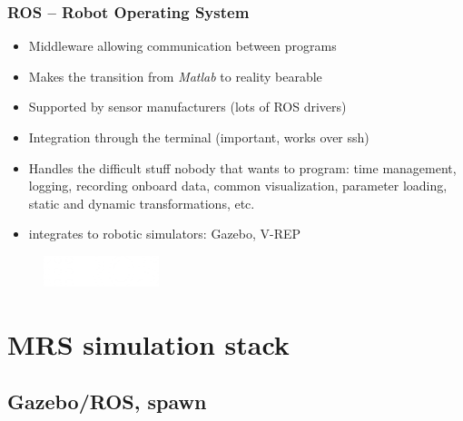 \documentclass[aspectratio=1610]{beamer}
\begin{document}


\begin{frame}
  \frametitle{ROS -- Robot Operating System}

  \begin{itemize}
    \item Middleware allowing communication between programs
    \item Makes the transition from \emph{Matlab} to reality bearable
    \item Supported by sensor manufacturers (lots of ROS drivers)
    \item Integration through the terminal (important, works over ssh)
    \item Handles the difficult stuff nobody that wants to program: time management, logging, recording onboard data, common visualization, parameter loading, static and dynamic transformations, etc.
    \item integrates to robotic simulators: Gazebo, V-REP
  \end{itemize}

  \begin{figure}
    \includegraphics[width=0.3\textwidth]{./fig/ros_logo.png}
  \end{figure}

\end{frame}



\section{MRS simulation stack}

\subsection{Gazebo/ROS, spawn}
\end{document}
